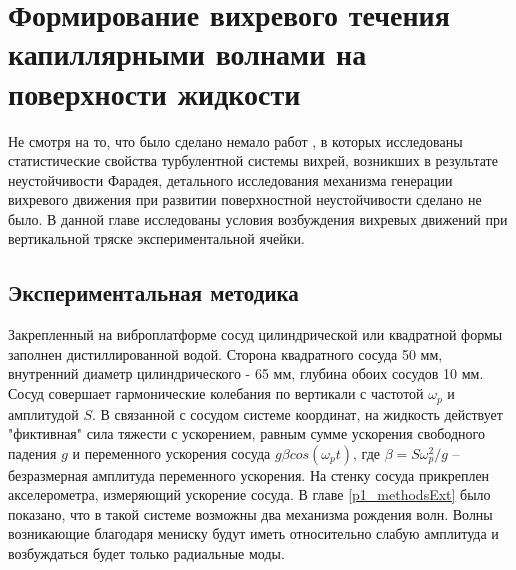 


\chapter{Формирование вихревого течения капиллярными волнами на поверхности жидкости} \label{chapt3}

Не смотря на то, что было сделано немало работ \cite{VonKameke2011, Francois2014, Francois2013}, в которых исследованы статистические свойства турбулентной системы вихрей, возникших в результате неустойчивости Фарадея, детального исследования механизма генерации вихревого движения при развитии поверхностной неустойчивости сделано не было. В данной главе исследованы условия возбуждения вихревых движений при вертикальной тряске экспериментальной ячейки.


\section{Экспериментальная методика}\label{sect3_2}
Закрепленный на виброплатформе сосуд цилиндрической или квадратной формы заполнен дистиллированной водой. Сторона квадратного сосуда 50 мм, внутренний диаметр цилиндрического - 65 мм, глубина обоих сосудов 10 мм. Сосуд совершает гармонические колебания по вертикали с частотой $\omega_p$ и амплитудой $S$. В связанной с сосудом системе координат, на жидкость действует "фиктивная" сила тяжести с ускорением, равным сумме ускорения свободного падения $g$ и переменного ускорения сосуда $g \beta cos(\omega_p t)$, где $\beta = S \omega_p^2/g$ – безразмерная амплитуда переменного ускорения. На стенку сосуда прикреплен акселерометра, измеряющий ускорение сосуда. В главе \ref{p1_methodsExt} было показано, что в такой системе возможны два механизма рождения волн. Волны возникающие благодаря мениску будут иметь относительно слабую амплитуда и возбуждаться будет только радиальные моды.


